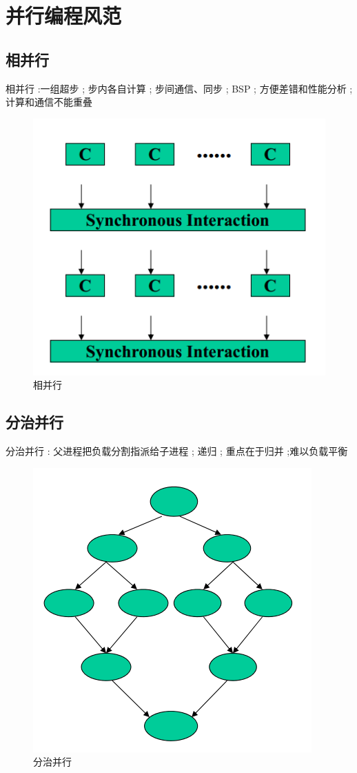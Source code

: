 \documentclass[UTF8,a4paper]{ctexart}
\begin{document}
\section{并行编程风范}
\subsection{相并行}
相并行 :一组超步 ; 步内各自计算 ; 步间通信、同步 ; BSP ; 方便差错和性能分析 ; 计算和通信不能重叠

\begin{figure}[H]
  \centering
  \includegraphics[scale = 0.3]{assets/ParallelComputing_5c10e.png}
  \caption{相并行}
\end{figure}

\subsection{分治并行}
分治并行 : 父进程把负载分割指派给子进程 ; 递归 ; 重点在于归并 ;难以负载平衡
\begin{figure}[H]
  \centering
  \includegraphics[scale = 0.3]{assets/ParallelComputing_d2aa6.png}
  \caption{分治并行}
\end{figure}
\end{document}
